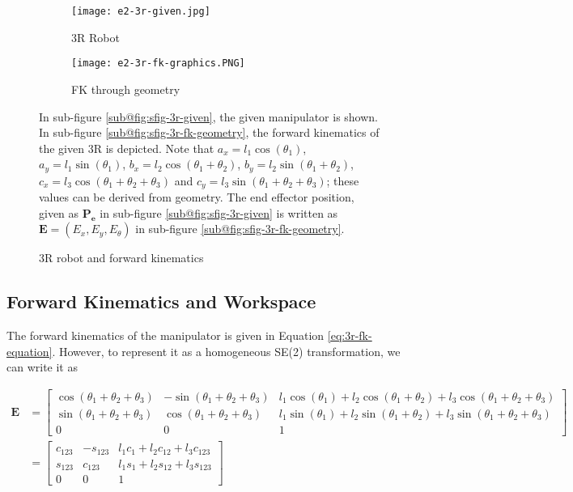 \begin{figure}[ht]
    \centering
    \begin{subfigure}[b]{0.3\textwidth}
        \centering
        \texttt{[image: e2-3r-given.jpg]}
        \caption{3R Robot}
        \label{fig:sfig-3r-given}
    \end{subfigure}
    \begin{subfigure}[b]{0.45\textwidth}
        \centering
        \texttt{[image: e2-3r-fk-graphics.PNG]}        
        \caption{FK through geometry}
        \label{fig:sfig-3r-fk-geometry}
    \end{subfigure}
    \caption{3R robot and forward kinematics}
    \small
        In sub-figure \ref{sub@fig:sfig-3r-given}, the given manipulator is shown. 
        In sub-figure \ref{sub@fig:sfig-3r-fk-geometry}, the forward kinematics of the given 3R is depicted. Note that $a_x = l_1 \cos(\theta_1)$, $a_y = l_1 \sin(\theta_1)$, $b_x = l_2 \cos(\theta_1 + \theta_2)$, $b_y = l_2 \sin(\theta_1 + \theta_2)$, $c_x = l_3 \cos(\theta_1 + \theta_2 + \theta_3)$ and $c_y = l_3 \sin(\theta_1 + \theta_2 + \theta_3)$; these values can be derived from geometry. The end effector position, given as $\mathbf{P_e}$ in sub-figure \ref{sub@fig:sfig-3r-given} is written as $\mathbf{E} = (E_x, E_y, E_{\theta})$ in sub-figure \ref{sub@fig:sfig-3r-fk-geometry}.
    \label{fig:3r-manipulator}
\end{figure}

\subsection[A2.2: Workspace]{Forward Kinematics and Workspace}

The forward kinematics of the manipulator is given in Equation \ref{eq:3r-fk-equation}. However, to represent it as a homogeneous SE(2) transformation, we can write it as

\begin{equation}
    \begin{split}
        \mathbf{E} &= \begin{bmatrix}
            \cos(\theta_1 + \theta_2 + \theta_3) & -\sin(\theta_1 + \theta_2 + \theta_3) & l_1 \cos(\theta_1) + l_2 \cos(\theta_1 + \theta_2) + l_3 \cos(\theta_1 + \theta_2 + \theta_3) \\
            \sin(\theta_1 + \theta_2 + \theta_3) & \cos(\theta_1 + \theta_2 + \theta_3) & l_1 \sin(\theta_1) + l_2 \sin(\theta_1 + \theta_2) + l_3 \sin(\theta_1 + \theta_2 + \theta_3) \\
            0 & 0 & 1
            \end{bmatrix} \\
        &= \begin{bmatrix}
            c_{123} & -s_{123} & l_1 c_1 + l_2 c_{12} + l_3 c_{123} \\
            s_{123} & c_{123} & l_1 s_1 + l_2 s_{12} + l_3 s_{123} \\
            0 & 0 & 1
            \end{bmatrix}
    \end{split}
\end{equation}

